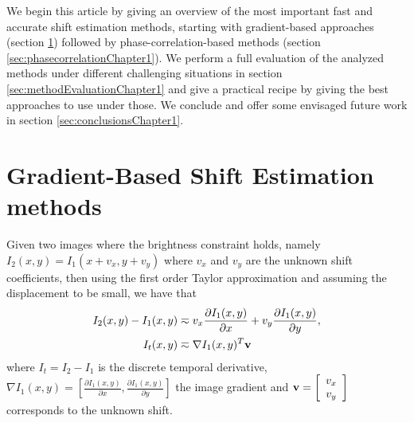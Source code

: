 We begin this article by giving an overview of the most important fast and accurate shift estimation methods, starting with gradient-based approaches (section \ref{sec:GBSE}) followed by phase-correlation-based methods (section \ref{sec:phasecorrelationChapter1}). We perform a full evaluation of the analyzed methods under different challenging situations in section \ref{sec:methodEvaluationChapter1} and give a practical recipe by  giving the best approaches to use under those. We conclude and offer some envisaged future work in section \ref{sec:conclusionsChapter1}.

%

\section{Gradient-Based Shift Estimation methods}
\label{sec:GBSE}

Given two images where the brightness constraint holds, namely $I_2(x,y) = I_1(x + v_x, y + v_y)$ where $v_x$ and $v_y$ are the unknown shift coefficients, then using the first order Taylor approximation and assuming the displacement to be small, we have that
\begin{align}
\nonumber \textstyle I_2(x,y) - I_1(x,y) &\eqsim v_x \frac{\partial I_1(x,y)}{\partial x} + v_y \frac{\partial I_1(x,y)}{\partial y}, \\
I_t(x,y) &\eqsim \nabla I_1(x,y)^T  \mathbf{v}
\label{eq:LucasKanadeGBSE}
\end{align}
where $I_t = I_2 - I_1$ is the discrete temporal derivative, $\nabla I_1(x,y) = \left[ \frac{\partial I_1(x,y)}{\partial x}, \frac{\partial I_1(x,y)}{\partial y}\right]$ the image gradient and $\mathbf{v} = \left[
\begin{array}{c} 
v_x\\ v_y 
\end{array}
\right]$ corresponds to the unknown shift.

